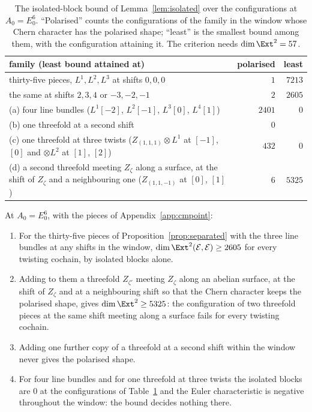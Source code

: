 \begin{table}[t]
\caption{The isolated-block bound of Lemma~\ref{lem:isolated} over the configurations at $A_{0}=E_{0}^{6}$. ``Polarised'' counts the configurations of the family in the window whose Chern character has the polarised shape; ``least'' is the smallest bound among them, with the configuration attaining it. The criterion needs $\dim\Ext^{2}=57$.}
\label{tab:e06count}
\centering
\footnotesize
\setlength{\tabcolsep}{3pt}
\begin{tabular}{@{}p{}rr@{}}
\hline
family (least bound attained at) & polarised & least \\
\hline
thirty-five pieces, $L^{1},L^{2},L^{3}$ at shifts $0,0,0$ & $1$ & $7213$ \\
the same at shifts $2,3,4$ or $-3,-2,-1$ & $2$ & $2605$ \\
(a) four line bundles ($L^{1}[-2]$, $L^{2}[-1]$, $L^{3}[0]$, $L^{4}[1]$) & $2401$ & $0$ \\
(b) one threefold at a second shift & $0$ & \\
(c) one threefold at three twists ($Z_{(1,1,1)}\otimes L^{1}$ at $[-1]$, $[0]$ and $\otimes L^{2}$ at $[1]$, $[2]$) & $432$ & $0$ \\
(d) a second threefold meeting $Z_{\zeta}$ along a surface, at the shift of $Z_{\zeta}$ and a neighbouring one ($Z_{(1,1,-1)}$ at $[0]$, $[1]$) & $6$ & $5325$ \\
\hline
\end{tabular}
\end{table}

\begin{proposition}\label{prop:e06count}
At $A_{0}=E_{0}^{6}$, with the pieces of Appendix~\ref{app:cmpoint}:
\begin{enumerate}[label=\textup{(\roman*)}]
\item For the thirty-five pieces of Proposition~\ref{prop:separated} with the three line bundles at any shifts in the window, $\dim\Ext^{2}(\mathcal{E},\mathcal{E})\ge2605$ for every twisting cochain, by isolated blocks alone.
\item Adding to them a threefold $Z_{\zeta'}$ meeting $Z_{\zeta}$ along an abelian surface, at the shift of $Z_{\zeta}$ and at a neighbouring shift so that the Chern character keeps the polarised shape, gives $\dim\Ext^{2}\ge5325$: the configuration of two threefold pieces at the same shift meeting along a surface fails for every twisting cochain.
\item Adding one further copy of a threefold at a second shift within the window never gives the polarised shape.
\item For four line bundles and for one threefold at three twists the isolated blocks are $0$ at the configurations of Table~\ref{tab:e06count} and the Euler characteristic is negative throughout the window: the bound decides nothing there.
\end{enumerate}
\end{proposition}

